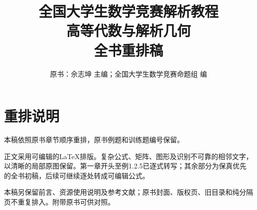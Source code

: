 \documentclass[UTF8,a4paper,11pt,oneside]{ctexbook}
\title{全国大学生数学竞赛解析教程\\高等代数与解析几何\\全书重排稿}
\author{原书：佘志坤 主编；全国大学生数学竞赛命题组 编}
\date{}
\begin{document}
\sloppy
\maketitle
\chapter*{重排说明}
\noindent 本稿依照原书章节顺序重排，原书例题和训练题编号保留。

正文采用可编辑的LaTeX排版。复杂公式、矩阵、图形及识别不可靠的相邻文字，以清晰的局部原图保留。第一章开头至例1.2.5已逐式转写；其余部分为保真优先的全书初稿，后续可继续逐处转成可编辑公式。

本稿另保留前言、资源使用说明及参考文献；原书封面、版权页、旧目录和纯分隔页不重复排入。附带原书可供对照。
\tableofcontents








\end{document}
